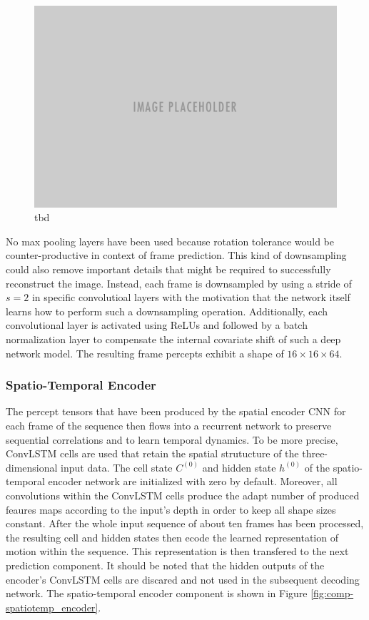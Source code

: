 \begin{figure}[htb]
	\centering
	\includegraphics[width=0.6\linewidth]{figures/placeholder.png} 
	\caption[Spatial Encoder Component]{tbd} \label{fig:comp-spatial_encoder}
\end{figure}

No max pooling layers have been used because rotation tolerance would be counter-productive in context of frame prediction. This kind of downsampling could also remove important details that might be required to successfully reconstruct the image. Instead, each frame is downsampled by using a stride of $ s=2 $ in specific convolutioal layers with the motivation that the network itself learns how to perform such a downsampling operation. Additionally, each convolutional layer is activated using ReLUs and followed by a batch normalization layer to compensate the internal covariate shift of such a deep network model. The resulting frame percepts exhibit a shape of $16\times16\times64$.

\subsubsection{Spatio-Temporal Encoder}

The percept tensors that have been produced by the spatial encoder CNN for each frame of the sequence then flows into a recurrent network to preserve sequential correlations and to learn temporal dynamics. To be more precise, ConvLSTM cells are used that retain the spatial strutucture of the three-dimensional input data. The cell state $C^{(0)}$ and hidden state $h^{(0)}$ of the spatio-temporal encoder network are initialized with zero by default. Moreover, all convolutions within the ConvLSTM cells produce the adapt number of produced feaures maps according to the input's depth in order to keep all shape sizes constant. After the whole input sequence of about ten frames has been processed, the resulting cell and hidden states then ecode the learned representation of motion within the sequence. This representation is then transfered to the next prediction component. It should be noted that the hidden outputs of the encoder's ConvLSTM cells are discared and not used in the subsequent decoding network. The spatio-temporal encoder component is shown in Figure \ref{fig:comp-spatiotemp_encoder}.

